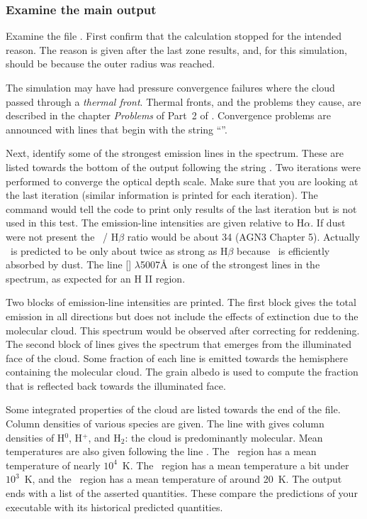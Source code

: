 \documentclass[12pt,twoside]{article}
\begin{document}
\subsubsection{Examine the main output}

Examine the file .  First confirm that the
calculation stopped for the intended reason.  The reason is given after
the last zone results, and, for this simulation, should be because the outer
radius was reached.

The simulation may have had pressure convergence failures where the cloud
passed through a \emph{thermal front}.
Thermal fronts, and the problems they cause,
are described in the chapter \emph{Problems} of Part~2 of \Hazy.
Convergence problems are announced with lines that begin
with the string ``''.

Next, identify some of the strongest emission lines in the spectrum.
These are listed towards the bottom of the output following the string
.
Two iterations were performed to converge the
optical depth scale.
Make sure that you are looking at the last iteration
(similar information is printed for each iteration).
The command  would tell the code to print
only results of the last iteration but is not used in this test.
The emission-line intensities are given relative
to $\mathrm{H}\alpha$.
If dust were not present the \la\ / H$\beta$ ratio would be
about 34 (AGN3 Chapter 5).
Actually \la\ is predicted to be only about twice as strong
as H$\beta$ because \la\ is efficiently absorbed by dust.
The line [\oiii] $\lambda$5007\AA\ is one of the strongest lines
in the spectrum, as expected for an H II region.

Two blocks of emission-line intensities are printed.  The first block
 gives
the total emission in all directions
but does not include the effects of extinction due to the molecular cloud.
This spectrum would be observed after correcting for reddening. The second
block of lines  gives the spectrum that emerges
from the illuminated face of the cloud.  Some fraction of each line is
emitted towards the hemisphere containing the molecular cloud.  The grain
albedo is used to compute the fraction that is reflected back towards the
illuminated face.

Some integrated properties of the cloud are listed towards the end of
the file.
Column densities of various species are given.
The line with 
gives column densities of H$^0$, H$^+$,
and H$_2$: the cloud is predominantly molecular.
Mean temperatures are also
given following the line .
The \hplus\ region has a mean temperature of nearly $10^4$~K.
The \hO\ region has a mean temperature a bit under $10^3$~K,
and the \htwo\ region has a mean temperature
of around 20~K.
The output ends with a list of the asserted quantities.
These compare the predictions of your executable with its historical
predicted quantities.
\end{document}
